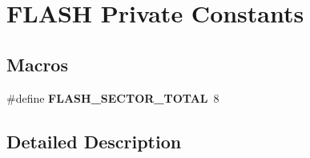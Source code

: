 \hypertarget{group___f_l_a_s_h_ex___private___constants}{}\section{F\+L\+A\+SH Private Constants}
\label{group___f_l_a_s_h_ex___private___constants}
\subsection*{Macros}
\begin{DoxyCompactItemize}
\item 
\#define {\bfseries F\+L\+A\+S\+H\+\_\+\+S\+E\+C\+T\+O\+R\+\_\+\+T\+O\+T\+AL}~8\hypertarget{group___f_l_a_s_h_ex___private___constants_ga44d83bdaa00f69521aa42e3f2f2f8db2}{}\label{group___f_l_a_s_h_ex___private___constants_ga44d83bdaa00f69521aa42e3f2f2f8db2}

\end{DoxyCompactItemize}


\subsection{Detailed Description}
